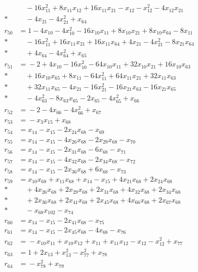 \documentclass[11pt]{article}
\theoremstyle{remark}\newtheorem{remark}[theorem]{Remark}
\begin{document}
\begin{align*}
&\quad{}-16x_{11}^{2}+8x_{11}x_{12}+16x_{11}x_{21}-x_{12}-x_{12}^{2}-4x_{12}x_{21}\\*
&\quad{}-4x_{21}-4x_{21}^{2}+x_{64}\\[2pt]
r_{50}&={}1-4x_{10}-4x_{10}^{2}-16x_{10}x_{11}+8x_{10}x_{21}+8x_{10}x_{64}-8x_{11}\\*
&\quad{}-16x_{11}^{2}+16x_{11}x_{21}+16x_{11}x_{64}+4x_{21}-4x_{21}^{2}-8x_{21}x_{64}\\*
&\quad{}+4x_{64}-4x_{64}^{2}+x_{65}\\[2pt]
r_{51}&={}-2+4x_{10}-16x_{10}^{2}-64x_{10}x_{11}+32x_{10}x_{21}+16x_{10}x_{63}\\*
&\quad{}+16x_{10}x_{65}+8x_{11}-64x_{11}^{2}+64x_{11}x_{21}+32x_{11}x_{63}\\*
&\quad{}+32x_{11}x_{65}-4x_{21}-16x_{21}^{2}-16x_{21}x_{63}-16x_{21}x_{65}\\*
&\quad{}-4x_{63}^{2}-8x_{63}x_{65}-2x_{65}-4x_{65}^{2}+x_{66}\\[2pt]
r_{52}&={}-2-4x_{66}-4x_{66}^{2}+x_{67}\\[2pt]
r_{53}&={}-x_{3}x_{15}+x_{68}\\[2pt]
r_{54}&={}x_{14}-x_{15}-2x_{24}x_{68}-x_{69}\\[2pt]
r_{55}&={}x_{14}-x_{15}-4x_{26}x_{68}-2x_{29}x_{68}-x_{70}\\[2pt]
r_{56}&={}x_{14}-x_{15}-2x_{31}x_{68}-6x_{68}-x_{71}\\[2pt]
r_{57}&={}x_{14}-x_{15}-4x_{32}x_{68}-2x_{34}x_{68}-x_{72}\\[2pt]
r_{58}&={}x_{14}-x_{15}-2x_{36}x_{68}+6x_{68}-x_{73}\\[2pt]
r_{59}&={}x_{10}x_{68}+x_{11}x_{68}+x_{14}-x_{15}+4x_{21}x_{68}+2x_{24}x_{68}\\*
&\quad{}+4x_{26}x_{68}+2x_{29}x_{68}+2x_{31}x_{68}+4x_{32}x_{68}+2x_{34}x_{68}\\*
&\quad{}+2x_{36}x_{68}+2x_{41}x_{68}+2x_{45}x_{68}+4x_{66}x_{68}+2x_{67}x_{68}\\*
&\quad{}-x_{68}x_{102}-x_{74}\\[2pt]
r_{60}&={}x_{14}-x_{15}-2x_{41}x_{68}-x_{75}\\[2pt]
r_{61}&={}x_{14}-x_{15}-2x_{45}x_{68}-4x_{68}-x_{76}\\[2pt]
r_{62}&={}-x_{10}x_{11}+x_{10}x_{12}+x_{11}+x_{11}x_{12}-x_{12}-x_{12}^{2}+x_{77}\\[2pt]
r_{63}&={}1+2x_{13}+x_{13}^{2}-x_{77}^{2}+x_{78}\\[2pt]
r_{64}&={}-x_{78}^{2}+x_{79}\\[2pt]

\end{align*}
\end{document}
